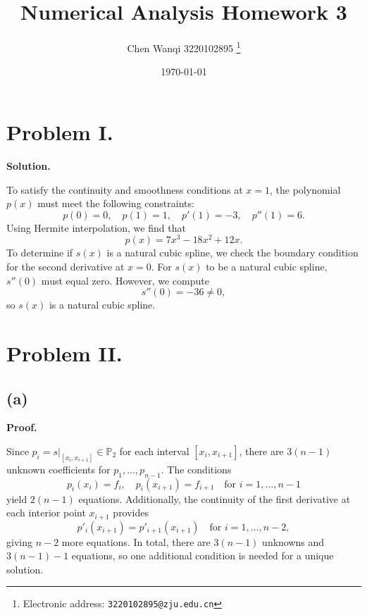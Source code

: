 \documentclass[a4paper]{article}
\begin{document}
\title{Numerical Analysis Homework 3}

\author{Chen Wanqi 3220102895
  \thanks{Electronic address: \texttt{3220102895@zju.edu.cn}}}


\date{\today}

\maketitle

\section*{Problem I.}

\textbf{Solution.}

To satisfy the continuity and smoothness conditions at \( x = 1 \), the polynomial \( p(x) \) must meet the following constraints:
\[
p(0) = 0, \quad p(1) = 1, \quad p'(1) = -3, \quad p''(1) = 6.
\]
Using Hermite interpolation, we find that
\[
\boxed{p(x) = 7x^3 - 18x^2 + 12x}.
\]
To determine if \( s(x) \) is a natural cubic spline, we check the boundary condition for the second derivative at \( x = 0 \). For \( s(x) \) to be a natural cubic spline, \( s''(0) \) must equal zero. However, we compute
\[
s''(0) = -36 \neq 0,
\]
so \( s(x) \) is  a natural cubic spline.

\section*{Problem II.}

\subsection*{(a)}

\textbf{Proof.}

Since \( p_i = s|_{[x_i, x_{i+1}]} \in \mathbb{P}_2 \) for each interval \([x_i, x_{i+1}]\), there are \(3(n - 1)\) unknown coefficients for \(p_1, \ldots, p_{n-1}\). The conditions
\[
p_i(x_i) = f_i, \quad p_i(x_{i+1}) = f_{i+1} \quad \text{for } i = 1, \ldots, n - 1
\]
yield \(2(n - 1)\) equations. Additionally, the continuity of the first derivative at each interior point \(x_{i+1}\) provides
\[
p'_i(x_{i+1}) = p'_{i+1}(x_{i+1}) \quad \text{for } i = 1, \ldots, n - 2,
\]
giving \(n - 2\) more equations. In total, there are \(3(n - 1)\) unknowns and \(3(n - 1) - 1\) equations, so one additional condition is needed for a unique solution.
\end{document}
